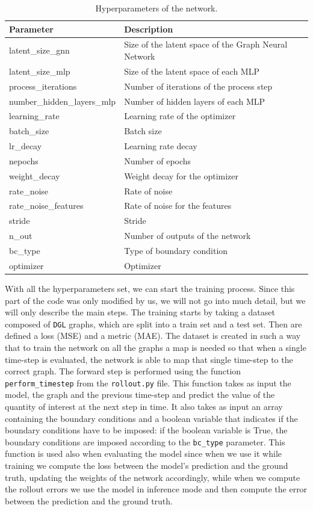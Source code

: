 \documentclass[11pt,a4paper]{article}
\begin{document}
\begin{table}[H]
\centering
\begin{tabular}{|l|l|}
\hline
\textbf{Parameter} & \textbf{Description} \\
\hline
latent\_size\_gnn & Size of the latent space of the Graph Neural Network \\
latent\_size\_mlp & Size of the latent space of each MLP \\
process\_iterations & Number of iterations of the process step \\
number\_hidden\_layers\_mlp & Number of hidden layers of each MLP \\
learning\_rate & Learning rate of the optimizer \\
batch\_size & Batch size \\
lr\_decay & Learning rate decay \\
nepochs & Number of epochs \\
weight\_decay & Weight decay for the optimizer \\
rate\_noise & Rate of noise \\
rate\_noise\_features & Rate of noise for the features \\
stride & Stride \\
n\_out & Number of outputs of the network \\
bc\_type & Type of boundary condition \\
optimizer & Optimizer \\
\hline
\end{tabular}
\caption{Hyperparameters of the network.}
\label{hyperparams_description}
\end{table}

With all the hyperparameters set, we can start the training process. Since this part of the code was only modified by us, we will not go into much detail, but we will only describe the main steps. The training starts by taking a dataset composed of \texttt{DGL} graphs, which are split into a train set and a test set. Then are defined a loss (MSE) and a metric (MAE). The dataset is created in such a way that to train the network on all the graphs a map is needed so that when a single time-step is evaluated, the network is able to map that single time-step to the correct graph. The forward step is performed using the function \texttt{perform\_timestep} from the \texttt{rollout.py} file. This function takes as input the model, the graph and the previous time-step and predict the value of the quantity of interest at the next step in time. It also takes as input an array containing the boundary conditions and a boolean variable that indicates if the boundary conditions have to be imposed: if the boolean variable is True, the boundary conditions are imposed according to the \texttt{bc\_type} parameter.
This function is used also when evaluating the model since when we use it while training we compute the loss between the model's prediction and the ground truth, updating the weights of the network accordingly, while when we compute the rollout errors we use the model in inference mode and then compute the error between the prediction and the ground truth.
\end{document}
